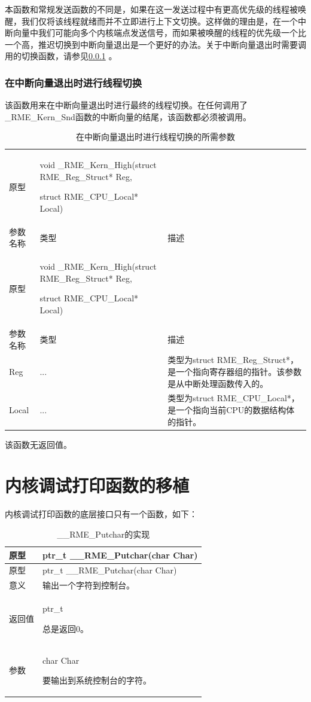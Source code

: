本函数和常规发送函数的不同是，如果在这一发送过程中有更高优先级的线程被唤醒，我们仅将该线程就绪而并不立即进行上下文切换。这样做的理由是，在一个中断向量中我们可能向多个内核端点发送信号，而如果被唤醒的线程的优先级一个比一个高，推迟切换到中断向量退出是一个更好的办法。关于中断向量退出时需要调用的切换函数，请参见\ref{subsubsec:7-thread-switch-on-interrupt-vector-exit}
。

\subsubsection{在中断向量退出时进行线程切换}\label{subsubsec:7-thread-switch-on-interrupt-vector-exit}

该函数用来在中断向量退出时进行最终的线程切换。在任何调用了\_RME\_Kern\_Snd函数的中断向量的结尾，该函数都必须被调用。

\begin{xltabular}{\textwidth}{@{}>{\hsize\raggedright\arraybackslash}X>{\hsize\raggedright\arraybackslash}X>{\hsize\raggedright\arraybackslash}X@{}}
\caption{在中断向量退出时进行线程切换的所需参数}\label{tab:7-27-thread-switch-on-interrupt-vector-exit-parameters}\\
\toprule
原型\strut
 & void \_RME\_Kern\_High(struct RME\_Reg\_Struct* Reg,

struct RME\_CPU\_Local* Local)\strut
 & \strut
\tabularnewline
参数名称 & 类型 & 描述\tabularnewline
\endfirsthead
\toprule
原型\strut
 & void \_RME\_Kern\_High(struct RME\_Reg\_Struct* Reg,

struct RME\_CPU\_Local* Local)\strut
 & \strut
\tabularnewline
参数名称 & 类型 & 描述\tabularnewline
\midrule
\endhead
\bottomrule
\endlastfoot
Reg & ... & 类型为struct
RME\_Reg\_Struct*，是一个指向寄存器组的指针。该参数是从中断处理函数传入的。\tabularnewline
Local & ... & 类型为struct
RME\_CPU\_Local*，是一个指向当前CPU的数据结构体的指针。\tabularnewline
\end{xltabular}

该函数无返回值。

\section{内核调试打印函数的移植}\label{sec:7-kernel-debug-print-function-porting}

内核调试打印函数的底层接口只有一个函数，如下：

\begin{xltabular}{\textwidth}{@{}>{\hsize\raggedright\arraybackslash}X>{\hsize\raggedright\arraybackslash}X@{}}
\caption{\_\_RME\_Putchar的实现}\label{tab:7-28-rme-putchar-implementation}\\
\toprule
原型 & ptr\_t \_\_RME\_Putchar(char Char)\tabularnewline
\endfirsthead
\toprule
原型 & ptr\_t \_\_RME\_Putchar(char Char)\tabularnewline
\midrule
\endhead
\bottomrule
\endlastfoot
意义 & 输出一个字符到控制台。\tabularnewline
返回值\strut
 & ptr\_t

总是返回0。\strut
\tabularnewline
参数\strut
 & char Char

要输出到系统控制台的字符。\strut
\tabularnewline
\end{xltabular}

